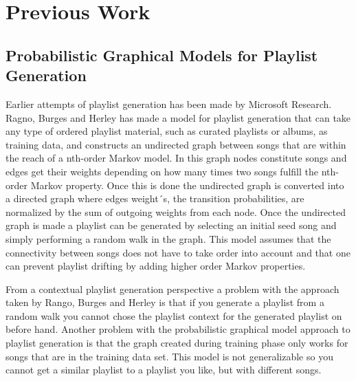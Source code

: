 \documentclass[a4paper,11pt]{kth-mag}
\begin{document}
\chapter{Previous Work}
\section{Probabilistic Graphical Models for Playlist Generation}
Earlier attempts of playlist generation has been made by Microsoft Research. Ragno, Burges and Herley has made a model for playlist generation that can take any type of ordered playlist material, such as curated playlists or albums, as training data, and constructs an undirected graph between songs that are within the reach of a nth-order Markov model. In this graph nodes constitute songs and edges get their weights depending on how many times two songs fulfill the nth-order Markov property. Once this is done the undirected graph is converted into a directed graph where edges weight´s, the transition probabilities, are normalized by the sum of outgoing weights from each node. Once the undirected graph is made a playlist can be generated by selecting an initial seed song and simply performing a random walk in the graph. This model assumes that the connectivity between songs does not have to take order into account and that one can prevent playlist drifting by adding higher order Markov properties\cite{ragno2005inferring}. 

From a contextual playlist generation perspective a problem with the approach taken by Rango, Burges and Herley is that if you generate a playlist from a random walk you cannot chose the playlist context for the generated playlist on before hand. Another problem with the probabilistic graphical model approach to playlist generation is that the graph created during training phase only works for songs that are in the training data set. This model is not generalizable so you cannot get a similar playlist to a playlist you like, but with different songs.
\end{document}
